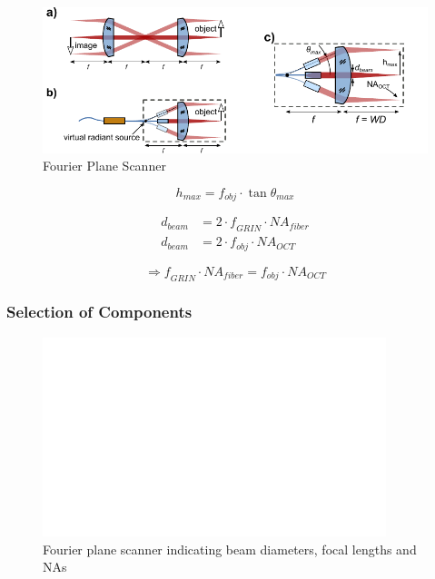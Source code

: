 \begin{figure}[h!]\centering \includegraphics{figures/30_DesignSimulation/fps.pdf}
      \caption{Fourier Plane Scanner}
\end{figure}

\begin{equation}
h_{max} = f_{obj}\cdot \tan  \theta_{max}
\end{equation}

\begin{align}
d_{beam} &= 2\cdot \mathit{f_{GRIN}}\cdot \mathit{NA_{fiber}} \\
d_{beam} &= 2 \cdot f_{obj}\cdot \mathit{NA_{OCT}}
\label{eq:fpsNA}
\end{align}

\begin{equation}
\Rightarrow \mathit{f_{GRIN}} \cdot \mathit{NA_{fiber}} = f_{obj} \cdot \mathit{NA_{OCT}}
\end{equation}


\subsubsection{Selection of Components}
\begin{figure}[h!]\centering \includegraphics[width=10cm,draft]{figures/foo.png}
      \caption{Fourier plane scanner indicating beam diameters, focal lengths and NAs}
\end{figure}

